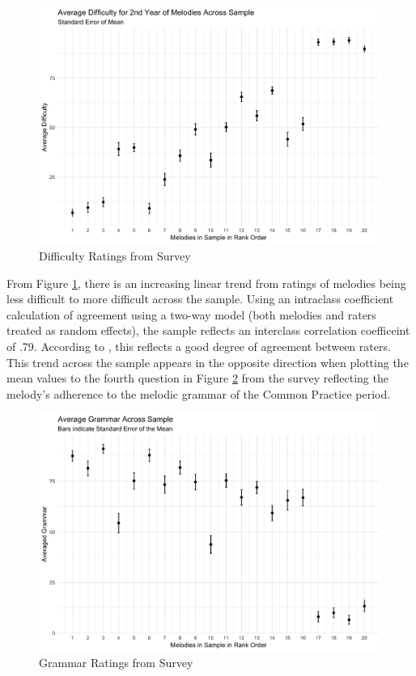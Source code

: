 \documentclass[12pt,]{book}
\begin{document}
\begin{figure}

{\centering \includegraphics[width=1\linewidth]{img/difficulty_plot} 

}

\caption{Difficulty Ratings from Survey}\label{fig:diffplot}
\end{figure}

From Figure \ref{fig:diffplot}, there is an increasing linear trend from ratings of melodies being less difficult to more difficult across the sample.
Using an intraclass coefficient calculation of agreement using a two-way model (both melodies and raters treated as random effects), the sample reflects an interclass correlation coefficeint of .79.
According to \citet{kooGuidelineSelectingReporting2016}, this reflects a good degree of agreement between raters.
This trend across the sample appears in the opposite direction when plotting the mean values to the fourth question in Figure \ref{fig:grammarplot} from the survey reflecting the melody's adherence to the melodic grammar of the Common Practice period.

\begin{figure}

{\centering \includegraphics[width=1\linewidth]{img/grammar_plot} 

}

\caption{Grammar Ratings from Survey}\label{fig:grammarplot}
\end{figure}
\end{document}
